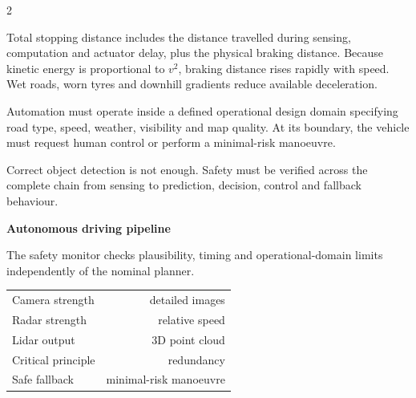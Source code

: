 \begin{multicols}{2}
\begin{ecarticle}
Total stopping distance includes the distance travelled during sensing, computation and actuator delay,
plus the physical braking distance. Because kinetic energy is proportional to $v^2$, braking distance
rises rapidly with speed. Wet roads, worn tyres and downhill gradients reduce available deceleration.

Automation must operate inside a defined operational design domain specifying road type, speed, weather,
visibility and map quality. At its boundary, the vehicle must request human control or perform a
minimal-risk manoeuvre.
\end{ecarticle}

\begin{tcolorbox}[title=\sffamily\bfseries Engineering Insight,colback=yellow!10,colframe=ECOrange]
Correct object detection is not enough. Safety must be verified across the complete chain from sensing
to prediction, decision, control and fallback behaviour.
\end{tcolorbox}

\begin{engineeringfocus}
\textbf{Autonomous driving pipeline}
\begin{center}
\end{center}
The safety monitor checks plausibility, timing and operational-domain limits independently of the nominal planner.
\end{engineeringfocus}

\begin{keyfigures}
\begin{tabularx}{\linewidth}{@{}Xr@{}}
Camera strength & detailed images\\
Radar strength & relative speed\\
Lidar output & 3D point cloud\\
Critical principle & redundancy\\
Safe fallback & minimal-risk manoeuvre
\end{tabularx}
\end{keyfigures}


\end{multicols}
